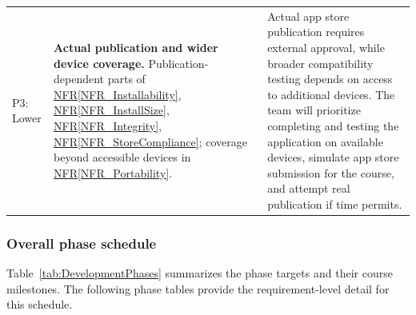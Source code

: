 \documentclass[10pt]{article}
\newcommand{\nfrref}[1]{\hyperref[#1]{NFR\ref*{#1}}}
\begin{document}
\begin{longtable}{@{}>{\raggedright\arraybackslash}p{}
>{\raggedright\arraybackslash}p{}
>{\raggedright\arraybackslash}p{}@{}}
P3: Lower &
\textbf{Actual publication and wider device coverage.}\newline
Publication-dependent parts of
\nfrref{NFR_Installability},
\nfrref{NFR_InstallSize},
\nfrref{NFR_Integrity},
\nfrref{NFR_StoreCompliance};
coverage beyond accessible devices in
\nfrref{NFR_Portability}. &
Actual app store publication requires external
approval, while broader compatibility testing
depends on access to additional devices.
The team will prioritize completing and testing
the application on available devices, simulate
app store submission for the course, and attempt
real publication if time permits. \\

\end{longtable}
\endgroup
\subsubsection*{Overall phase schedule}

Table~\ref{tab:DevelopmentPhases} summarizes the phase targets and their
course milestones. The following phase tables provide the requirement-level
detail for this schedule.
\end{document}
